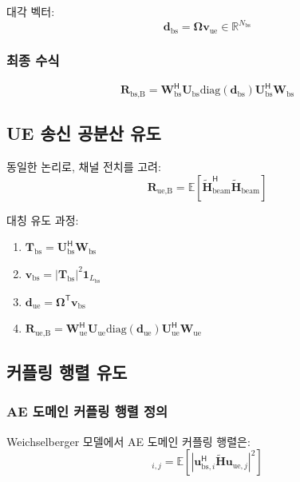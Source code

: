 \documentclass[10pt]{article}
\begin{document}
대각 벡터:
\begin{equation}
\mathbf{d}_{\text{bs}} = \boldsymbol{\Omega} \mathbf{v}_{\text{ue}} \in \mathbb{R}^{N_{\text{bs}}}
\end{equation}

\subsubsection{최종 수식}
\begin{equation}
\mathbf{R}_{\text{bs,B}} = \mathbf{W}_{\text{bs}}^{\mathsf{H}} \mathbf{U}_{\text{bs}} \text{diag}(\mathbf{d}_{\text{bs}}) \mathbf{U}_{\text{bs}}^{\mathsf{H}} \mathbf{W}_{\text{bs}}
\end{equation}

\subsection{UE 송신 공분산 유도}

동일한 논리로, 채널 전치를 고려:
\begin{equation}
\mathbf{R}_{\text{ue,B}} = \mathbb{E}[\tilde{\mathbf{H}}_{\text{beam}}^{\mathsf{H}} \tilde{\mathbf{H}}_{\text{beam}}]
\end{equation}

대칭 유도 과정:
\begin{enumerate}
    \item $\mathbf{T}_{\text{bs}} = \mathbf{U}_{\text{bs}}^{\mathsf{H}} \mathbf{W}_{\text{bs}}$
    \item $\mathbf{v}_{\text{bs}} = |\mathbf{T}_{\text{bs}}|^2 \mathbf{1}_{L_{\text{bs}}}$
    \item $\mathbf{d}_{\text{ue}} = \boldsymbol{\Omega}^{\mathsf{T}} \mathbf{v}_{\text{bs}}$
    \item $\mathbf{R}_{\text{ue,B}} = \mathbf{W}_{\text{ue}}^{\mathsf{H}} \mathbf{U}_{\text{ue}} \text{diag}(\mathbf{d}_{\text{ue}}) \mathbf{U}_{\text{ue}}^{\mathsf{H}} \mathbf{W}_{\text{ue}}$
\end{enumerate}

\subsection{커플링 행렬 유도}

\subsubsection{AE 도메인 커플링 행렬 정의}
Weichselberger 모델에서 AE 도메인 커플링 행렬은:
\begin{equation}
[\boldsymbol{\Omega}]_{i,j} = \mathbb{E}[|\mathbf{u}_{\text{bs},i}^{\mathsf{H}} \tilde{\mathbf{H}} \mathbf{u}_{\text{ue},j}|^2]
\end{equation}
\end{document}
